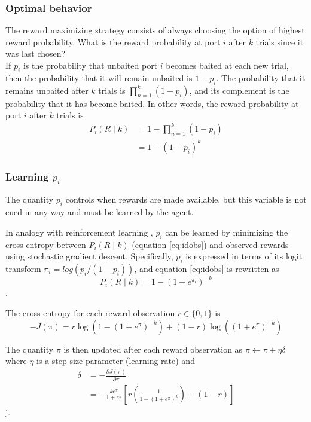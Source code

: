 \clearpage
\subsubsection{Optimal behavior} 

The reward maximizing strategy consists of always choosing the option of highest reward probability.
What is the reward probability at port $i$ after $k$ trials since it was last chosen? \\
If  $p_{i}$ is the probability that unbaited port $i$ becomes baited at each new trial, then the probability that it will remain unbaited is $1-p_i$.
The probability that it remains unbaited after $k$ trials is $\prod_{n=1}^k (1-p_i)$, and its complement is the probability that it has become baited.
In other words, the reward probability at port $i$ after $k$ trials is
\begin{align}
    P_i(R \mid k)& = 1 - \prod_{n=1}^k( 1-p_i)  \nonumber \\
    &= 1 - (1-p_i)^k    \label{eq:idobs}
\end{align}

\subsubsection*{Learning $p_i$}
The quantity $p_i$ controls when rewards are made available, but this variable is not cued in any way and must be learned by the agent.

In analogy with reinforcement learning \cite[section 9.3]{sutton2018reinforcement}, $p_i$ can be learned by minimizing the cross-entropy between $P_i(R \mid k)$ (equation \ref{eq:idobs}) and observed rewards using stochastic gradient descent.
Specifically, $p_i$ is expressed in terms of its logit transform $\pi_i = log(p_i/(1-p_i))$, and equation \ref{eq:idobs} is rewritten as
\begin{equation}
    P_i(R \mid k) = 1 - (1+e^{\pi_i})^{-k}
    \label{eq:idobs_pi}
\end{equation}.

The cross-entropy for each reward observation $r \in \{0,1\}$ is
\begin{equation}
    -J(\pi) = r \log \left(1-(1+e^\pi)^{-k}\right) + (1-r) \log \left((1+e^\pi)^{-k}\right)
    \label{eq:loss_xH}
\end{equation}

The quantity $\pi$ is then updated after each reward observation as $\pi \xleftarrow{} \pi + \eta \delta$ where $\eta$ is a step-size parameter (learning rate) and 
\begin{align}
    \delta &= - \frac{\partial J(\pi)}{\partial \pi} \nonumber \\
    &= - \frac{k e^{\pi}}{1+e^{\pi}} \left[r \left( \frac{1}{1-(1+e^\pi)^k}\right) + (1-r)  \right] \label{eq:dj_dpi}
\end{align}j.

